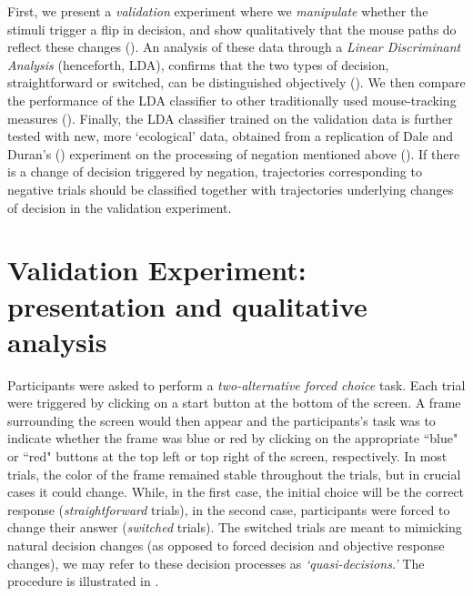 \documentclass[draft]{article}
\newcommand{\nbEC}[1]{{\leavevmode\color{blue}{\scriptsize#1}}}
\begin{document}
First, we present a \emph{validation} experiment where we \emph{manipulate} whether the stimuli trigger a flip in decision, and show qualitatively that the mouse paths do reflect these changes (). 
An analysis of these data through a \emph{Linear Discriminant Analysis} (henceforth, LDA), confirms that the two types of decision, straightforward or switched, can be distinguished objectively (). 
We then compare the performance of the LDA classifier to other traditionally used mouse-tracking measures (). 
Finally, the LDA classifier trained on the validation data is further tested with new, more `ecological' data, obtained from a replication of Dale and Duran's (\citeyear{Dale2011}) experiment on the processing of negation mentioned above (). If there is a change of decision triggered by negation, trajectories corresponding to negative trials should be classified together with trajectories underlying changes of decision in the validation experiment. 


\section{Validation Experiment: presentation and qualitative analysis}
\label{section:validation}

Participants were asked to perform a \emph{two-alternative forced choice} task. Each trial were triggered by clicking on a start button at the bottom of the screen. A frame surrounding the screen would then appear and the participants's task was to indicate whether the frame was blue or red by clicking on the appropriate ``blue" or ``red" buttons at the top left or top right of the screen, respectively. %
In most trials, the color of the frame remained stable throughout the trials, but in crucial cases it could change. 
While, in the first case, the initial choice will be the correct response (\textit{straightforward} trials), in the second case, participants were forced to change their answer (\textit{switched} trials). The switched trials are meant to mimicking natural decision changes (as opposed to forced decision and objective response changes), we may refer to these decision processes as \emph{`quasi-decisions.'}   
The procedure is illustrated in . 
\nbEC{The `quasi-decision' terminology is not so clear to me. There surely is a decision. Do you mean quasi-decision change? I am not sure we use it so much anyway though. Maybe we could just say here once and for all why that is different from a natural change of decision (the information actually change, as opposed to the weighting of the different pieces of information moving from one to another side of the possibilities) and then not come back to it.}
\end{document}
